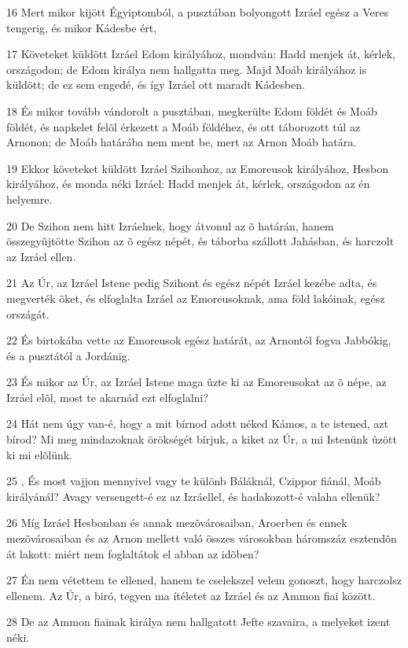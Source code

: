 \par 16 Mert mikor kijött Égyiptomból, a pusztában bolyongott Izráel egész a Veres tengerig, és mikor Kádesbe ért,
\par 17 Követeket küldött Izráel Edom királyához, mondván: Hadd menjek át, kérlek, országodon; de Edom királya nem hallgatta meg. Majd Moáb királyához is küldött; de ez sem engedé, és így Izráel ott maradt Kádesben.
\par 18 És mikor tovább vándorolt a pusztában, megkerülte Edom földét és Moáb földét, és napkelet felõl érkezett a Moáb földéhez, és ott táborozott túl az Arnonon; de Moáb határába nem ment be, mert az Arnon Moáb határa.
\par 19 Ekkor követeket küldött Izráel Szihonhoz, az Emoreusok királyához, Hesbon királyához, és monda néki Izráel: Hadd menjek át, kérlek, országodon az én helyemre.
\par 20 De Szihon nem hitt Izráelnek, hogy átvonul az õ határán, hanem összegyûjtötte Szihon az õ egész népét, és táborba szállott Jahásban, és harczolt az Izráel ellen.
\par 21 Az Úr, az Izráel Istene pedig Szihont és egész népét Izráel kezébe adta, és megverték õket, és elfoglalta Izráel az Emoreusoknak, ama föld lakóinak, egész országát.
\par 22 És birtokába vette az Emoreusok egész határát, az Arnontól fogva Jabbókig, és a pusztától a Jordánig.
\par 23 És mikor az Úr, az Izráel Istene maga ûzte ki az Emoreusokat az õ népe, az Izráel elõl, most te akarnád ezt elfoglalni?
\par 24 Hát nem úgy van-é, hogy a mit bírnod adott néked Kámos, a te istened, azt bírod? Mi meg mindazoknak örökségét bírjuk, a kiket az Úr, a mi Istenünk ûzött ki mi elõlünk.
\par 25 , És most vajjon mennyivel vagy te különb Báláknál, Czippor fiánál, Moáb királyánál? Avagy versengett-é ez az Izráellel, és hadakozott-é valaha ellenük?
\par 26 Míg Izráel Hesbonban és annak mezõvárosaiban, Aroerben és ennek mezõvárosaiban és az Arnon mellett való összes városokban háromszáz esztendõn át lakott: miért nem foglaltátok el abban az idõben?
\par 27 Én nem vétettem te ellened, hanem te cselekszel velem gonoszt, hogy harczolsz ellenem. Az Úr, a biró, tegyen ma ítéletet az Izráel és az Ammon fiai között.
\par 28 De az Ammon fiainak királya nem hallgatott Jefte szavaira, a melyeket izent néki.
